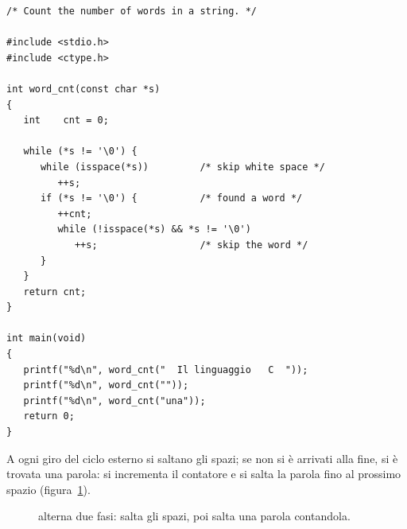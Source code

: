 \begin{affianco}[0.58][c]
\begin{lstlisting}[style=c, name=word_cnt.c]
/* Count the number of words in a string. */

#include <stdio.h>
#include <ctype.h>

int word_cnt(const char *s)
{
   int    cnt = 0;

   while (*s != '\0') {
      while (isspace(*s))         /* skip white space */
         ++s;
      if (*s != '\0') {           /* found a word */
         ++cnt;
         while (!isspace(*s) && *s != '\0')
            ++s;                  /* skip the word */
      }
   }
   return cnt;
}

int main(void)
{
   printf("%d\n", word_cnt("  Il linguaggio   C  "));
   printf("%d\n", word_cnt(""));
   printf("%d\n", word_cnt("una"));
   return 0;
}
\end{lstlisting}
\risultato
{}
\end{affianco}

A ogni giro del ciclo esterno si saltano gli spazi; se non si è arrivati
alla fine, si è trovata una parola: si incrementa il contatore e si salta la
parola fino al prossimo spazio (figura~\ref{fig:word-cnt}).

\begin{figure}[H]
  \centering
  \caption{ alterna due fasi: salta gli spazi, poi salta una
           parola contandola.}
  \label{fig:word-cnt}
\end{figure}

